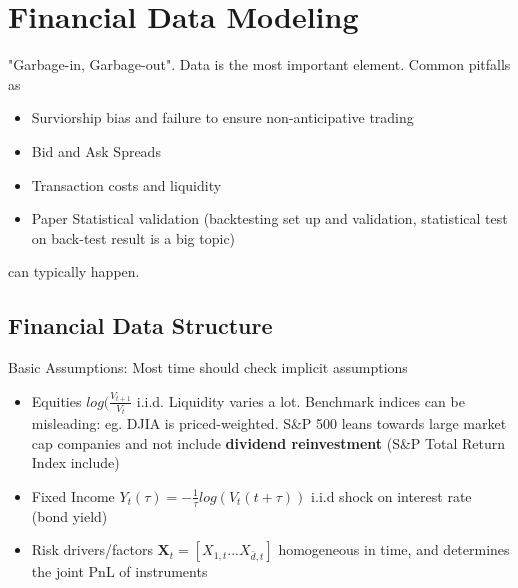 \documentclass[11pt, openany]{book}              %
\begin{document}
\chapter{Financial Data Modeling}


"Garbage-in, Garbage-out". Data is the most important element. Common pitfalls as

\begin{itemize}
	\item Surviorship bias and failure to ensure non-anticipative trading
	\item Bid and Ask Spreads
	\item Transaction costs and liquidity
	\item Paper Statistical validation (backtesting set up and validation, statistical test on back-test result is a big topic)
\end{itemize}

can typically happen. 

\section{Financial Data Structure}

Basic Assumptions: Most time should check implicit assumptions

\begin{itemize}
\item Equities $log(\frac{V_{t+1}}{V_t}$ i.i.d. Liquidity varies a lot. Benchmark indices can be misleading: eg. DJIA is priced-weighted. S\&P 500 leans towards large market cap companies and not include \textbf{dividend reinvestment} (S\&P Total Return Index include)
\item Fixed Income $Y_t(\tau) = -\frac{1}{\tau} log(V_t(t+\tau))$ i.i.d shock on interest rate (bond yield)
\item Risk drivers/factors $\mathbf{X}_t = [X_{1,t}...X_{\bar{d},t}]$ homogeneous in time, and determines the joint PnL of instruments

\end{itemize}
\end{document}
